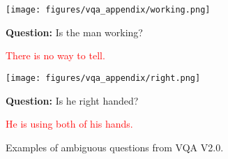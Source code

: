 \begin{figure}[h]
\begin{tcolorbox}[colback=gray!4, colframe=gray!50, arc=2mm, boxrule=0.5pt,left=9pt,right=9pt]
\begin{minipage}{0.48\textwidth}
\begin{tcolorbox}[colback=white, colframe=gray!50, arc=2mm, boxrule=0.5pt]
\begin{minipage}{0.36\textwidth}
\texttt{[image: figures/vqa\_appendix/working.png]}
\end{minipage}
\hfill
\begin{minipage}{0.5\textwidth}
\textbf{Question:} Is the man working?\\
\end{minipage}
\end{tcolorbox}
\hspace{1.4em}\textcolor{red}{There is no way to tell.}
\end{minipage}
\hfill
\begin{minipage}{0.48\textwidth}
    \begin{tcolorbox}[colback=white, colframe=gray!50, arc=2mm, boxrule=0.5pt]
\begin{minipage}{0.4\textwidth}
\texttt{[image: figures/vqa\_appendix/right.png]}
\end{minipage}
\hfill
\begin{minipage}{0.5\textwidth}
\textbf{Question:} Is he right handed?\\
\end{minipage}
    \end{tcolorbox}
\hspace{1.4em}\textcolor{red}{He is using both of his hands.}
\end{minipage}
\end{tcolorbox}
    \caption{Examples of ambiguous questions from VQA V2.0.}
    \label{appfig:vqa_label_errors}
\end{figure}
